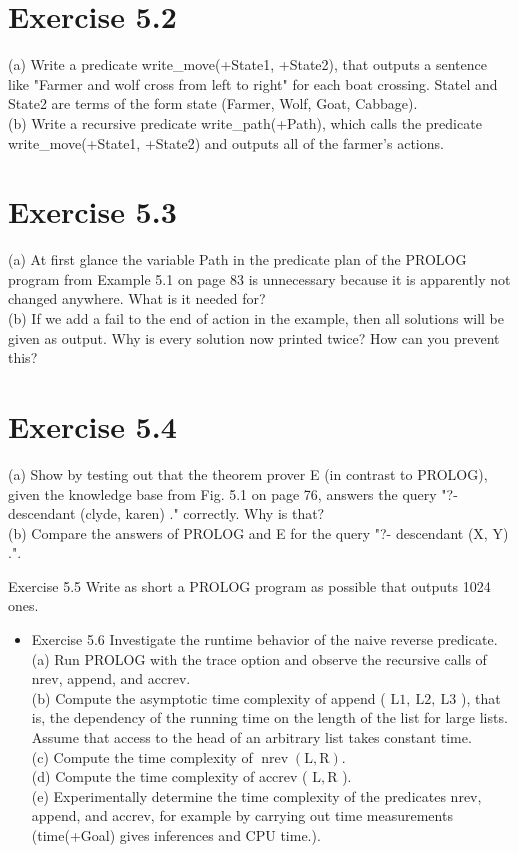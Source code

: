 \documentclass[10pt]{book}
\begin{document}
\begin{center}
\section*{Exercise 5.2}
(a) Write a predicate write\_move(+State1, +State2), that outputs a sentence like "Farmer and wolf cross from left to right" for each boat crossing. Statel and State2 are terms of the form state (Farmer, Wolf, Goat, Cabbage).\\
(b) Write a recursive predicate write\_path(+Path), which calls the predicate write\_move(+State1, +State2) and outputs all of the farmer's actions.

\section*{Exercise 5.3}
(a) At first glance the variable Path in the predicate plan of the PROLOG program from Example 5.1 on page 83 is unnecessary because it is apparently not changed anywhere. What is it needed for?\\
(b) If we add a fail to the end of action in the example, then all solutions will be given as output. Why is every solution now printed twice? How can you prevent this?

\section*{Exercise 5.4}
(a) Show by testing out that the theorem prover E (in contrast to PROLOG), given the knowledge base from Fig. 5.1 on page 76, answers the query "?- descendant (clyde, karen) ." correctly. Why is that?\\
(b) Compare the answers of PROLOG and E for the query "?- descendant (X, Y) .".

Exercise 5.5 Write as short a PROLOG program as possible that outputs 1024 ones.

\begin{itemize}
  \item Exercise 5.6 Investigate the runtime behavior of the naive reverse predicate.\\

(a) Run PROLOG with the trace option and observe the recursive calls of nrev, append, and accrev.\\
(b) Compute the asymptotic time complexity of append ( $\mathrm{L} 1, \mathrm{~L} 2, \mathrm{~L} 3$ ), that is, the dependency of the running time on the length of the list for large lists. Assume that access to the head of an arbitrary list takes constant time.\\
(c) Compute the time complexity of $\operatorname{nrev}(\mathrm{L}, \mathrm{R})$.\\
(d) Compute the time complexity of accrev ( $\mathrm{L}, \mathrm{R}$ ).\\
(e) Experimentally determine the time complexity of the predicates nrev, append, and accrev, for example by carrying out time measurements (time(+Goal) gives inferences and CPU time.).
\end{itemize}


\end{center}
\end{document}
